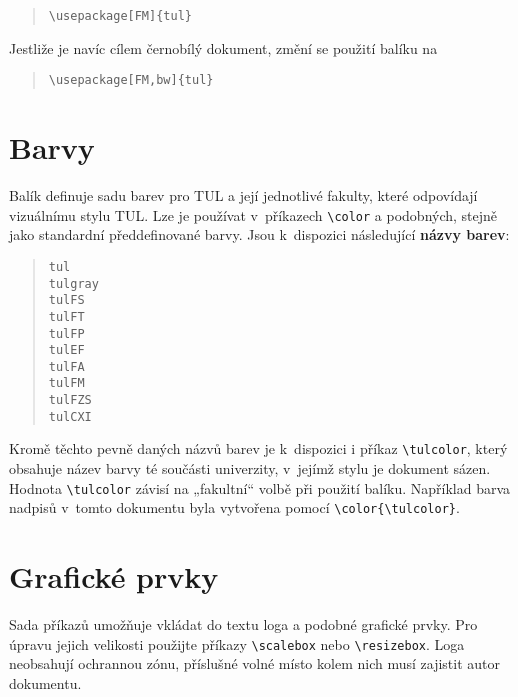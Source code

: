 \documentclass[a4paper,12pt,twoside]{article}
\newcommand{\cmdfont}[1]{\texttt{\color{\tulcolor}#1}}
\newcommand{\cmd}[1]{\cmdfont{\textbackslash #1}}
\newcommand{\demobox}{\raisebox{-.5ex}{\rule{1em}{1em}}}
\begin{document}
\begin{quote}
\cmd{usepackage[FM]\{tul\}}
\end{quote}

Jestliže je navíc cílem černobílý dokument, změní se použití balíku na

\begin{quote}
\cmd{usepackage[FM,bw]\{tul\}}
\end{quote}


\section{Barvy}

Balík definuje sadu barev pro TUL a její jednotlivé fakulty, které odpovídají
vizuálnímu stylu TUL. Lze je používat v~příkazech \cmd{color} a podobných,
stejně jako standardní předdefinované barvy. Jsou k~dispozici následující
\textbf{názvy barev}:

\begin{quote}
{\color{tul}\demobox}\quad\cmdfont{tul}\\
{\color{tulgray}\demobox}\quad\cmdfont{tulgray}\\
{\color{tulFS}\demobox}\quad\cmdfont{tulFS}\\
{\color{tulFT}\demobox}\quad\cmdfont{tulFT}\\
{\color{tulFP}\demobox}\quad\cmdfont{tulFP}\\
{\color{tulEF}\demobox}\quad\cmdfont{tulEF}\\
{\color{tulFA}\demobox}\quad\cmdfont{tulFA}\\
{\color{tulFM}\demobox}\quad\cmdfont{tulFM}\\
{\color{tulFZS}\demobox}\quad\cmdfont{tulFZS}\\
{\color{tulCXI}\demobox}\quad\cmdfont{tulCXI}
\end{quote}

Kromě těchto pevně daných názvů barev je k~dispozici i příkaz \cmd{tulcolor},
který obsahuje název barvy té součásti univerzity, v~jejímž stylu je dokument
sázen. Hodnota \cmd{tulcolor} závisí na „fakultní“ volbě při použití
balíku. Například barva nadpisů v~tomto dokumentu byla vytvořena pomocí
\cmd{color\{\textbackslash tulcolor\}}.


\section{Grafické prvky}

Sada příkazů umožňuje vkládat do textu loga a podobné grafické prvky. Pro
úpravu jejich velikosti použijte příkazy \cmd{scalebox} nebo \cmd{resizebox}.
Loga neobsahují ochrannou zónu, příslušné volné místo kolem nich musí zajistit
autor dokumentu.
\end{document}
